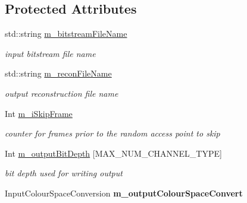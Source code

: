 \subsection*{Protected Attributes}
\begin{DoxyCompactItemize}
\item 
\mbox{\label{class_t_app_dec_cfg_a7aecc540040bea15545aa0e9b2a87b73}} 
std\+::string \hyperlink{class_t_app_dec_cfg_a7aecc540040bea15545aa0e9b2a87b73}{m\+\_\+bitstream\+File\+Name}
\begin{DoxyCompactList}\small\item\em input bitstream file name \end{DoxyCompactList}\item 
\mbox{\label{class_t_app_dec_cfg_a278334f882a0a48b0cb14a2d3e90dbec}} 
std\+::string \hyperlink{class_t_app_dec_cfg_a278334f882a0a48b0cb14a2d3e90dbec}{m\+\_\+recon\+File\+Name}
\begin{DoxyCompactList}\small\item\em output reconstruction file name \end{DoxyCompactList}\item 
\mbox{\label{class_t_app_dec_cfg_a3665b663132840bf4334db6b78348173}} 
Int \hyperlink{class_t_app_dec_cfg_a3665b663132840bf4334db6b78348173}{m\+\_\+i\+Skip\+Frame}
\begin{DoxyCompactList}\small\item\em counter for frames prior to the random access point to skip \end{DoxyCompactList}\item 
\mbox{\label{class_t_app_dec_cfg_a1f7d011ec47a153b247aca128a6c253e}} 
Int \hyperlink{class_t_app_dec_cfg_a1f7d011ec47a153b247aca128a6c253e}{m\+\_\+output\+Bit\+Depth} \mbox{[}M\+A\+X\+\_\+\+N\+U\+M\+\_\+\+C\+H\+A\+N\+N\+E\+L\+\_\+\+T\+Y\+PE\mbox{]}
\begin{DoxyCompactList}\small\item\em bit depth used for writing output \end{DoxyCompactList}\item 
\mbox{\label{class_t_app_dec_cfg_a4450c66b2fd4fa17f6612ab17d509223}} 
Input\+Colour\+Space\+Conversion {\bfseries m\+\_\+output\+Colour\+Space\+Convert}

\end{DoxyCompactItemize}

